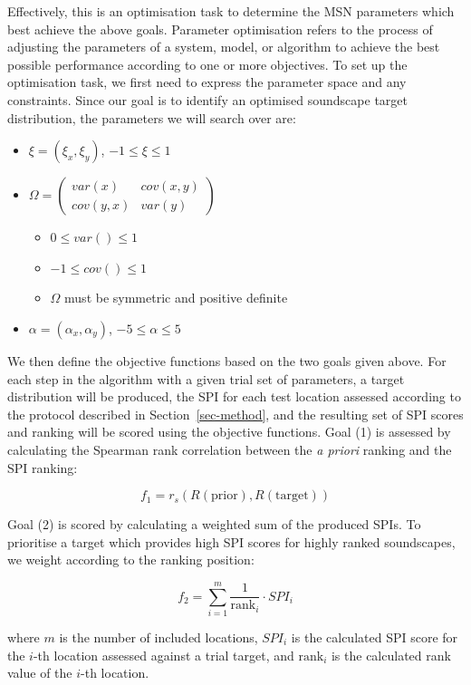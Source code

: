 \documentclass[
  authoryear,
  preprint,
  3p]{elsarticle}
\providecommand{\tightlist}{%
  \setlength{\itemsep}{0pt}\setlength{\parskip}{0pt}}\usepackage{longtable,booktabs,array}
\begin{document}
Effectively, this is an optimisation task to determine the MSN
parameters which best achieve the above goals. Parameter optimisation
refers to the process of adjusting the parameters of a system, model, or
algorithm to achieve the best possible performance according to one or
more objectives. To set up the optimisation task, we first need to
express the parameter space and any constraints. Since our goal is to
identify an optimised soundscape target distribution, the parameters we
will search over are:

\begin{itemize}
\tightlist
\item
  \(\xi = (\xi_x, \xi_y)\), \(-1 \leq \xi \leq 1\)
\item
  \(\Omega = \begin{pmatrix} var(x) & cov(x, y) \\ cov(y, x) & var(y) \end{pmatrix}\)

  \begin{itemize}
  \tightlist
  \item
    \(0 \leq var() \leq 1\)
  \item
    \(-1 \leq cov() \leq 1\)
  \item
    \(\Omega\) must be symmetric and positive definite
  \end{itemize}
\item
  \(\alpha = (\alpha_x, \alpha_y)\), \(-5 \leq \alpha \leq 5\)
\end{itemize}

We then define the objective functions based on the two goals given
above. For each step in the algorithm with a given trial set of
parameters, a target distribution will be produced, the SPI for each
test location assessed according to the protocol described in
Section~\ref{sec-method}, and the resulting set of SPI scores and
ranking will be scored using the objective functions. Goal (1) is
assessed by calculating the Spearman rank correlation between the
\emph{a priori} ranking and the SPI ranking:

\[
f_1 = r_{s}(R(\text{prior}), R(\text{target}))
\]

Goal (2) is scored by calculating a weighted sum of the produced SPIs.
To prioritise a target which provides high SPI scores for highly ranked
soundscapes, we weight according to the ranking position:

\[
f_2 = \sum_{i=1}^m \frac{1}{\text{rank}_i} \cdot SPI_i
\]

where \(m\) is the number of included locations, \(SPI_i\) is the
calculated SPI score for the \(i\)-th location assessed against a trial
target, and \(\text{rank}_i\) is the calculated rank value of the
\(i\)-th location.
\end{document}
